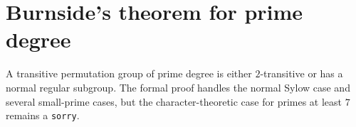 \section{Burnside's theorem for prime degree}

\begin{theorem}
\label{thm:burnside-prime-degree}
\notready
A transitive permutation group of prime degree is either $2$-transitive or has a normal regular subgroup. The formal proof handles the normal Sylow case and several small-prime cases, but the character-theoretic case for primes at least $7$ remains a \texttt{sorry}.
\end{theorem}
